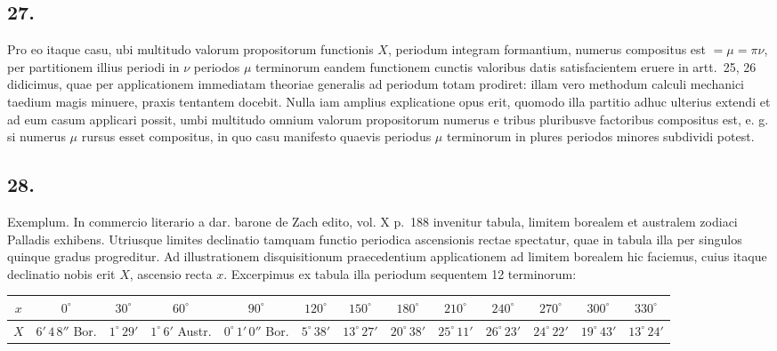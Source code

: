 \documentclass[12pt,a4paper]{article}
\theoremstyle{plain}
\begin{document}
\subsection*{27.}

Pro eo itaque casu, ubi multitudo valorum propositorum functionis $X$, periodum integram formantium, numerus compositus est $= \mu = \pi\nu$, per partitionem illius
periodi in $\nu$ periodos $\mu$ terminorum eandem functionem cunctis valoribus datis satisfacientem eruere in artt.\ 25, 26 didicimus, quae per applicationem immediatam
theoriae generalis ad periodum totam prodiret: illam vero methodum calculi mechanici taedium magis minuere, praxis tentantem docebit. Nulla iam amplius explicatione opus
erit, quomodo illa partitio adhuc ulterius extendi et ad eum casum applicari possit, umbi multitudo omnium valorum propositorum numerus e tribus pluribusve factoribus
compositus est, e. g. si numerus $\mu$ rursus esset compositus, in quo casu manifesto quaevis periodus $\mu$ terminorum in plures periodos minores subdividi potest.

\subsection*{28.}

Exemplum. In commercio literario a dar. barone de Zach edito, vol. X p.\ 188 invenitur tabula, limitem borealem et australem zodiaci Palladis exhibens.
Utriusque limites declinatio tamquam functio periodica ascensionis rectae spectatur, quae in tabula illa per singulos quinque gradus progreditur. Ad illustrationem
disquisitionum praecedentium applicationem ad limitem borealem hic faciemus, cuius itaque declinatio nobis erit $X$, ascensio recta $x$. Excerpimus ex tabula illa
periodum sequentem 12 terminorum:

\begin{center}
\begin{tabular}{c|cccccccccccc}
$x$ & $0^{\circ}$ & $30^{\circ}$ & $60^{\circ}$ & $90^{\circ}$ & $120^{\circ}$ & $150^{\circ}$ & $180^{\circ}$ & $210^{\circ}$ & $240^{\circ}$ & $270^{\circ}$ & $300^{\circ}$ & $330^{\circ}$ \\
\hline
$X$ & $6'\,4\,8''$ Bor. & $1^{\circ}\,29'$ & $1^{\circ}\,6'$ Austr. & $0^{\circ}\,1'\,0''$ Bor. & $5^{\circ}\,38'$ & $13^{\circ}\,27'$ & $20^{\circ}\,38'$ & $25^{\circ}\,11'$ & $26^{\circ}\,23'$ & $24^{\circ}\,22'$ & $19^{\circ}\,43'$ & $13^{\circ}\,24'$
\end{tabular}
\end{center}
\end{document}

